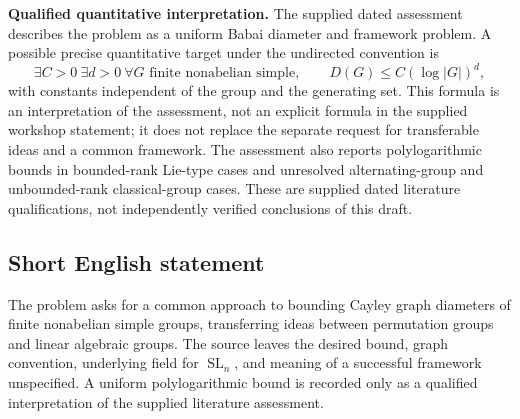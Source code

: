 \documentclass[11pt]{article}
\begin{document}
\textbf{Qualified quantitative interpretation.} The supplied dated assessment describes the problem as a uniform Babai diameter and framework problem. A possible precise quantitative target under the undirected convention is
\[
\exists C>0\ \exists d>0\ \forall G\text{ finite nonabelian simple},\qquad
D(G)\leq C(\log |G|)^d,
\]
with constants independent of the group and the generating set. This formula is an interpretation of the assessment, not an explicit formula in the supplied workshop statement; it does not replace the separate request for transferable ideas and a common framework. The assessment also reports polylogarithmic bounds in bounded-rank Lie-type cases and unresolved alternating-group and unbounded-rank classical-group cases. These are supplied dated literature qualifications, not independently verified conclusions of this draft.
\subsection{Short English statement}
The problem asks for a common approach to bounding Cayley graph diameters of finite nonabelian simple groups, transferring ideas between permutation groups and linear algebraic groups. The source leaves the desired bound, graph convention, underlying field for \(\operatorname{SL}_n\), and meaning of a successful framework unspecified. A uniform polylogarithmic bound is recorded only as a qualified interpretation of the supplied literature assessment.
\end{document}
